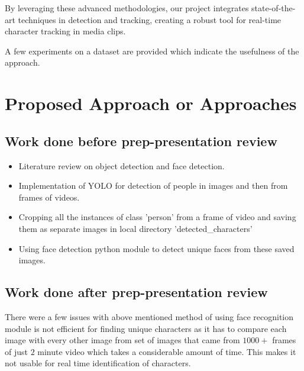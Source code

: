 \documentclass[twoside,english]{article}
\begin{document}
    By leveraging these advanced methodologies, our project integrates state-of-the-art techniques in detection and tracking, creating a robust tool for real-time character tracking in media clips.

    A few experiments on a dataset are provided which indicate the usefulness of the approach.


\section{Proposed Approach or Approaches} \label{sec:our_proj}

\subsection{Work done before prep-presentation review} 
\begin{itemize}
    \setlength{\itemsep}{0.5mm}
    \item Literature review on object detection and face detection.
    \item Implementation of YOLO for detection of people in images and then from frames of videos.
    \item Cropping all the instances of class 'person' from a frame of video and saving them as separate images in local directory 'detected\_characters'
    \item Using face detection python module to detect unique faces from these saved images.    
\end{itemize}

\vspace{-0.8cm}
\subsection{Work done after prep-presentation review} 
    There were a few issues with above mentioned method of using face recognition module is not efficient for finding unique characters as it has to compare each image with every other image from set of images that came from $1000+$ frames of just $2$ minute video which takes a considerable amount of time. This makes it not usable for real time identification of characters.
\end{document}
